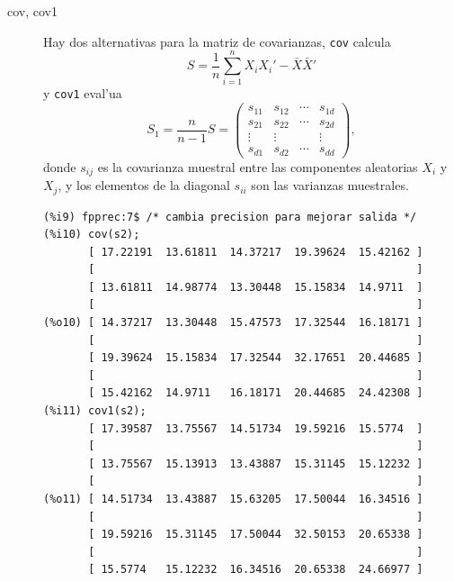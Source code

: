 \documentclass[spanish,12pt,a4paper]{article}
\begin{document}
\begin{description}

\item[cov, cov1] Hay dos alternativas para la matriz de covarianzas, \verb|cov| calcula
\[
S = \frac{1}{n} \sum_{i=1}^n X_i X_i' - \bar{X} \bar{X}'
\]
y \verb|cov1| eval'ua
\[
S_1  =  \frac{n}{n-1}S 
     =    \left(
          \begin{array}{cccc}
          s_{11}  &  s_{12}  &  \cdots  &  s_{1d}  \\
          s_{21}  &  s_{22}  &  \cdots  &  s_{2d}  \\
          \vdots  &  \vdots  &          &  \vdots  \\
          s_{d1}  &  s_{d2}  &  \cdots  &  s_{dd}
          \end{array}
          \right),
\]
donde $s_{ij}$ es la covarianza muestral entre las componentes aleatorias $X_i$ y $X_j$, y los elementos de la diagonal $s_{ii}$ son las varianzas muestrales.

\begin{verbatim}
(%i9) fpprec:7$ /* cambia precision para mejorar salida */
(%i10) cov(s2);
       [ 17.22191  13.61811  14.37217  19.39624  15.42162 ]
       [                                                  ]
       [ 13.61811  14.98774  13.30448  15.15834  14.9711  ]
       [                                                  ]
(%o10) [ 14.37217  13.30448  15.47573  17.32544  16.18171 ]
       [                                                  ]
       [ 19.39624  15.15834  17.32544  32.17651  20.44685 ]
       [                                                  ]
       [ 15.42162  14.9711   16.18171  20.44685  24.42308 ]
(%i11) cov1(s2);
       [ 17.39587  13.75567  14.51734  19.59216  15.5774  ]
       [                                                  ]
       [ 13.75567  15.13913  13.43887  15.31145  15.12232 ]
       [                                                  ]
(%o11) [ 14.51734  13.43887  15.63205  17.50044  16.34516 ]
       [                                                  ]
       [ 19.59216  15.31145  17.50044  32.50153  20.65338 ]
       [                                                  ]
       [ 15.5774   15.12232  16.34516  20.65338  24.66977 ]
\end{verbatim}



\end{description}
\end{document}
